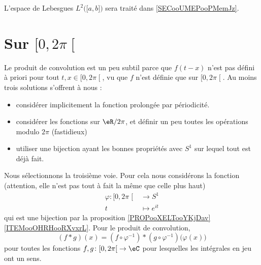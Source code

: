 L'espace de Lebesgues \( L^2\big( \mathopen[ a , b \mathclose] \big)\) sera traité dans \ref{SECooUMEPooPMemJz}.



\section{Sur \( \mathopen[ 0 , 2\pi \mathclose[\)}

Le produit de convolution est un peu subtil parce que \( f(t-x)\) n'est pas défini à priori pour tout \( t,x\in \mathopen[ 0 , 2\pi \mathclose[\), vu que \( f\) n'est définie que sur \( \mathopen[ 0 , 2\pi \mathclose[\). Au moins trois solutions s'offrent à nous :
\begin{itemize}
	\item
	      considérer implicitement la fonction prolongée par périodicité.
	\item
	      considérer les fonctions sur \( \eR/2\pi\), et définir un peu toutes les opérations modulo \( 2\pi\) (fastidieux)
	\item
	      utiliser une bijection ayant les bonnes propriétés avec \( S^1\) sur lequel tout est déjà fait.
\end{itemize}
Nous sélectionnons la troisième voie. Pour cela nous considérons la fonction (attention, elle n'est pas tout à fait la même que celle plus haut)
\begin{equation}
	\begin{aligned}
		\varphi\colon \mathopen[ 0 , 2\pi \mathclose[ & \to S^1         \\
		t                                             & \mapsto  e^{it}
	\end{aligned}
\end{equation}
qui est une bijection par la proposition \ref{PROPooXELTooYKjDav}\ref{ITEMooOHRHooRXvxrL}. Pour le produit de convolution,
\begin{equation}
	(f * g)(x)=(f\circ \varphi^{-1})*(g\circ\varphi^{-1})\big( \varphi(x) \big)
\end{equation}
pour toutes les fonctions \( f,g\colon \mathopen[ 0 , 2\pi \mathclose[\to \eC\) pour lesquelles les intégrales en jeu ont un sens.
